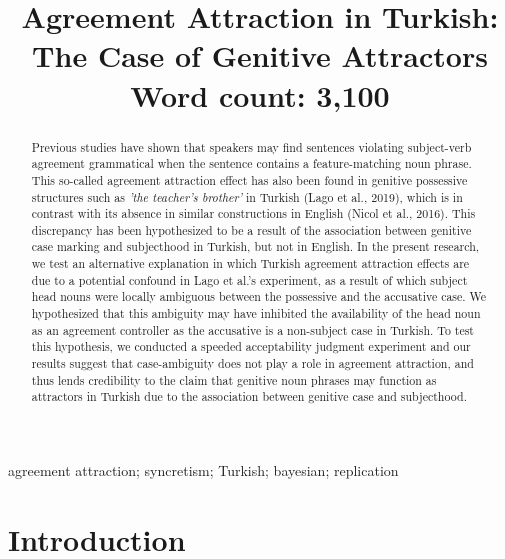 \documentclass[apacite,linguex]{glossa}\usepackage[]{graphicx}\usepackage[]{color}
\title[Agreement Attraction in Turkish]{Agreement Attraction in Turkish: The Case of Genitive Attractors\\ \bigskip \large Word count: 3,100}
\author[\firstauthor \& \secondauthor]%
{%
  \spauthor{\texttt{Hidden Hidden (\firstauthor)}\\ 
  \institute{\texttt{Hidden University}}\\
  \small{
    \texttt{hidden@hidden.edu}}
  }
  \AND
  \spauthor{\texttt{Hidden Hidden (\secondauthor)}\\ 
  \institute{\texttt{Hidden University}}\\
  \small{
    \texttt{hidden@hidden.edu}}
  }%
}
\begin{document}
\sffamily
\maketitle


\begin{abstract}

Previous studies have shown that speakers may find sentences violating subject-verb agreement grammatical when the sentence contains a feature-matching noun phrase. 
%
This so-called agreement attraction effect has also been found in genitive possessive structures such as \textit{'the teacher's brother'} in Turkish (Lago et al., 2019), which is in contrast with its absence in similar constructions in English (Nicol et al., 2016). This discrepancy has been hypothesized to be a result of the association between genitive case marking and subjecthood in Turkish, but not in English.
%
In the present research, we test an alternative explanation in which Turkish agreement attraction effects are due to a potential confound in Lago et al.'s experiment, as a result of which subject head nouns were locally ambiguous between the possessive and the accusative case. We hypothesized that this ambiguity may have inhibited the availability of the head noun as an agreement controller as the accusative is a non-subject case in Turkish. To test this hypothesis, we conducted a speeded acceptability judgment experiment and our results suggest that case-ambiguity does not play a role in agreement attraction, and thus lends credibility to the claim that genitive noun phrases may function as attractors in Turkish due to the association between genitive case and subjecthood. 

\end{abstract}

\begin{keywords}
agreement attraction; syncretism; Turkish; bayesian; replication
\end{keywords}

\rmfamily



\section{Introduction}
\end{document}
